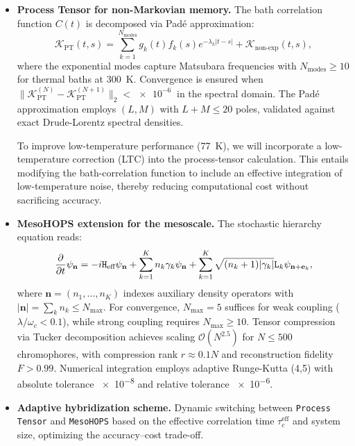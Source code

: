 \documentclass[12pt, a4paper]{article}
\begin{document}
\begin{itemize}
    \item \textbf{Process Tensor for non-Markovian memory.} 
    The bath correlation function $C(t)$ is decomposed via Padé approximation:
    \begin{equation}
    \label{eq:process_tensor}
    \mathcal{K}_{\text{PT}}(t,s) = \sum_{k=1}^{N_{\text{modes}}} g_k(t) f_k(s) e^{-\lambda_k |t-s|} + \mathcal{K}_{\text{non-exp}}(t,s),
    \end{equation}
    where the exponential modes capture Matsubara frequencies with $N_{\text{modes}} \geq 10$ for thermal baths at \SI{300}{\kelvin}. Convergence is ensured when $\|\mathcal{K}_{\text{PT}}^{(N)} - \mathcal{K}_{\text{PT}}^{(N+1)}\|_2 < \SI{e-6}{}$ in the spectral domain. The Padé approximation employs $(L,M)$ with $L+M \leq 20$ poles, validated against exact Drude-Lorentz spectral densities.

    To improve low-temperature performance (\SI{77}{\kelvin}), we will incorporate a low-temperature correction (LTC) into the process-tensor calculation. This entails modifying the bath-correlation function to include an effective integration of low-temperature noise, thereby reducing computational cost without sacrificing accuracy.
    
    \item \textbf{MesoHOPS extension for the mesoscale.}
    The stochastic hierarchy equation reads:
    \begin{equation}
    \label{eq:mesohops}
    \pdv{t} \psi_{\mathbf{n}} = -i\mathtt{H}_{\text{eff}}\psi_{\mathbf{n}} + \sum_{k=1}^K n_k\gamma_k\psi_{\mathbf{n}} + \sum_{k=1}^K \sqrt{(n_k+1)|\gamma_k|} \mathtt{L}_k\psi_{\mathbf{n}+\mathbf{e}_k},
    \end{equation}
    where $\mathbf{n} = (n_1, \ldots, n_K)$ indexes auxiliary density operators with $|\mathbf{n}| = \sum_k n_k \leq N_{\text{max}}$. For convergence, $N_{\text{max}} = 5$ suffices for weak coupling ($\lambda/\omega_c < 0.1$), while strong coupling requires $N_{\text{max}} \geq 10$. Tensor compression via Tucker decomposition achieves scaling $\mathcal{O}(N^{2.5})$ for $N \leq 500$ chromophores, with compression rank $r \approx 0.1N$ and reconstruction fidelity $F > 0.99$. Numerical integration employs adaptive Runge-Kutta (4,5) with absolute tolerance \SI{e-8}{} and relative tolerance \SI{e-6}{}.
    
    \item \textbf{Adaptive hybridization scheme.} Dynamic switching between \texttt{Process Tensor} and \texttt{MesoHOPS} based on the effective correlation time $\tau_c^{\text{eff}}$ and system size, optimizing the accuracy–cost trade-off.
\end{itemize}
\end{document}
